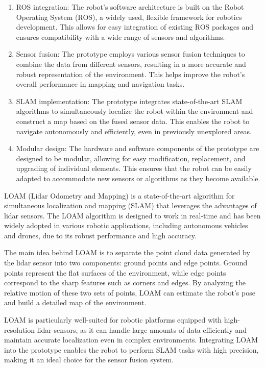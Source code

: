 \documentclass[12pt]{article}
\begin{document}
\begin{enumerate}
    \item ROS integration: The robot's software architecture is built on the Robot Operating System (ROS), a widely used, flexible framework for robotics development. This allows for easy integration of existing ROS packages and ensures compatibility with a wide range of sensors and algorithms.

    \item Sensor fusion: The prototype employs various sensor fusion techniques to combine the data from different sensors, resulting in a more accurate and robust representation of the environment. This helps improve the robot's overall performance in mapping and navigation tasks.
    
    \item SLAM implementation: The prototype integrates state-of-the-art SLAM algorithms to simultaneously localize the robot within the environment and construct a map based on the fused sensor data. This enables the robot to navigate autonomously and efficiently, even in previously unexplored areas.
    
    \item Modular design: The hardware and software components of the prototype are designed to be modular, allowing for easy modification, replacement, and upgrading of individual elements. This ensures that the robot can be easily adapted to accommodate new sensors or algorithms as they become available.
\end{enumerate}

LOAM (Lidar Odometry and Mapping) is a state-of-the-art algorithm for simultaneous localization and mapping (SLAM) that leverages the advantages of lidar sensors. The LOAM algorithm is designed to work in real-time and has been widely adopted in various robotic applications, including autonomous vehicles and drones, due to its robust performance and high accuracy.

The main idea behind LOAM is to separate the point cloud data generated by the lidar sensor into two components: ground points and edge points. Ground points represent the flat surfaces of the environment, while edge points correspond to the sharp features such as corners and edges. By analyzing the relative motion of these two sets of points, LOAM can estimate the robot's pose and build a detailed map of the environment.

LOAM is particularly well-suited for robotic platforms equipped with high-resolution lidar sensors, as it can handle large amounts of data efficiently and maintain accurate localization even in complex environments. Integrating LOAM into the prototype enables the robot to perform SLAM tasks with high precision, making it an ideal choice for the sensor fusion system.
\end{document}
